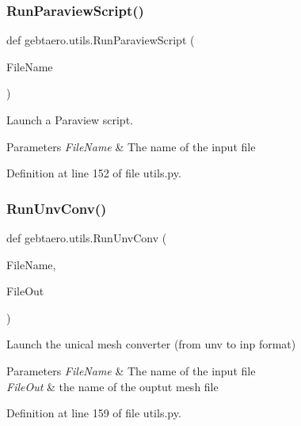 \subsubsection{\texorpdfstring{Run\+Paraview\+Script()}{RunParaviewScript()}}
{\footnotesize\ttfamily def gebtaero.\+utils.\+Run\+Paraview\+Script (\begin{DoxyParamCaption}\item[{}]{File\+Name }\end{DoxyParamCaption})}



Launch a Paraview script. 


\begin{DoxyParams}{Parameters}
{\em File\+Name} & The name of the input file \\
\hline
\end{DoxyParams}


Definition at line 152 of file utils.\+py.

\mbox{\label{namespacegebtaero_1_1utils_ae04f5967428b15a9dc2971f6a2396938}} 
\subsubsection{\texorpdfstring{Run\+Unv\+Conv()}{RunUnvConv()}}
{\footnotesize\ttfamily def gebtaero.\+utils.\+Run\+Unv\+Conv (\begin{DoxyParamCaption}\item[{}]{File\+Name,  }\item[{}]{File\+Out }\end{DoxyParamCaption})}



Launch the unical mesh converter (from unv to inp format) 


\begin{DoxyParams}{Parameters}
{\em File\+Name} & The name of the input file \\
\hline
{\em File\+Out} & the name of the ouptut mesh file \\
\hline
\end{DoxyParams}


Definition at line 159 of file utils.\+py.

